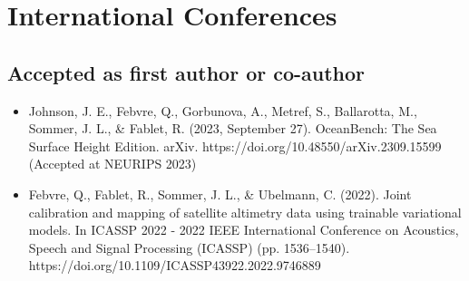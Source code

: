 \section*{International Conferences}
\subsection*{Accepted as first author or co-author}
\begin{itemize}
    \item Johnson, J. E., Febvre, Q., Gorbunova, A., Metref, S., Ballarotta, M., Sommer, J. L., \& Fablet, R. (2023, September 27). OceanBench: The Sea Surface Height Edition. arXiv. https://doi.org/10.48550/arXiv.2309.15599 (Accepted at NEURIPS 2023)
    \item Febvre, Q., Fablet, R., Sommer, J. L., \& Ubelmann, C. (2022). Joint calibration and mapping of satellite altimetry data using trainable variational models. In ICASSP 2022 - 2022 IEEE International Conference on Acoustics, Speech and Signal Processing (ICASSP) (pp. 1536–1540). https://doi.org/10.1109/ICASSP43922.2022.9746889
\end{itemize}






